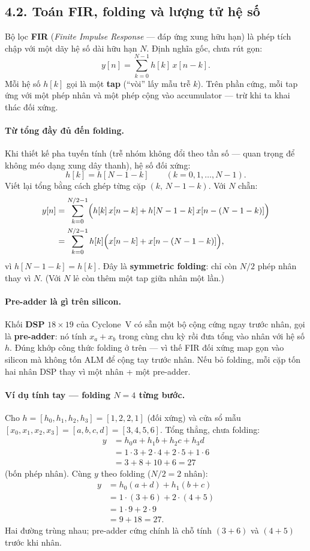 \subsection*{4.2. Toán FIR, folding và lượng tử hệ số}

Bộ lọc \textbf{FIR} (\emph{Finite Impulse Response} --- đáp ứng xung hữu hạn) là phép tích chập với một dãy hệ số dài hữu hạn $N$. Định nghĩa gốc, chưa rút gọn:
\[
y[n]=\sum_{k=0}^{N-1}h[k]\,x[n-k].
\]
Mỗi hệ số $h[k]$ gọi là một \textbf{tap} (``vòi'' lấy mẫu trễ $k$). Trên phần cứng, mỗi tap ứng với một phép nhân và một phép cộng vào accumulator --- trừ khi ta khai thác đối xứng.

\paragraph{Từ tổng đầy đủ đến folding.} Khi thiết kế pha tuyến tính (trễ nhóm không đổi theo tần số --- quan trọng để không méo dạng xung dây thanh), hệ số đối xứng:
\[
h[k]=h[N-1-k]\qquad(k=0,1,\ldots,N-1).
\]
Viết lại tổng bằng cách ghép từng cặp $(k,\,N-1-k)$. Với $N$ chẵn:
\begin{align*}
y[n]
&=\sum_{k=0}^{N/2-1}\Bigl(h[k]\,x[n-k]+h[N-1-k]\,x[n-(N-1-k)]\Bigr)\\
&=\sum_{k=0}^{N/2-1}h[k]\Bigl(x[n-k]+x[n-(N-1-k)]\Bigr),
\end{align*}
vì $h[N-1-k]=h[k]$. Đây là \textbf{symmetric folding}: chỉ còn $N/2$ phép nhân thay vì $N$. (Với $N$ lẻ còn thêm một tap giữa nhân một lần.)

\paragraph{Pre-adder là gì trên silicon.} Khối \textbf{DSP} $18\times 19$ của Cyclone~V có sẵn một bộ cộng cứng ngay trước nhân, gọi là \textbf{pre-adder}: nó tính $x_a+x_b$ trong cùng chu kỳ rồi đưa tổng vào nhân với hệ số $h$. Đúng khớp công thức folding ở trên --- vì thế FIR đối xứng map gọn vào silicon mà không tốn ALM để cộng tay trước nhân. Nếu bỏ folding, mỗi cặp tốn hai nhân DSP thay vì một nhân + một pre-adder.

\paragraph{Ví dụ tính tay --- folding $N=4$ từng bước.} Cho $h=[h_0,h_1,h_2,h_3]=[1,2,2,1]$ (đối xứng) và cửa sổ mẫu $[x_0,x_1,x_2,x_3]=[a,b,c,d]=[3,4,5,6]$. Tổng thẳng, chưa folding:
\begin{align*}
y
&=h_0 a+h_1 b+h_2 c+h_3 d\\
&=1\cdot 3+2\cdot 4+2\cdot 5+1\cdot 6\\
&=3+8+10+6=27
\end{align*}
(bốn phép nhân). Cùng $y$ theo folding ($N/2=2$ nhân):
\begin{align*}
y
&=h_0(a+d)+h_1(b+c)\\
&=1\cdot(3+6)+2\cdot(4+5)\\
&=1\cdot 9+2\cdot 9\\
&=9+18=27.
\end{align*}
Hai đường trùng nhau; pre-adder cứng chính là chỗ tính $(3+6)$ và $(4+5)$ trước khi nhân.

